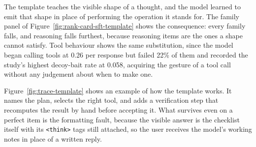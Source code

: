 The template teaches the visible shape of a thought, and the model learned to emit that shape in place of performing the operation it stands for. The family panel of Figure~\ref{fig:rank-card-sft-template} shows the consequence: every family falls, and reasoning falls furthest, because reasoning items are the ones a shape cannot satisfy. Tool behaviour shows the same substitution, since the model began calling tools at 0.26 per response but failed 22\% of them and recorded the study's highest decoy-bait rate at 0.058, acquiring the gesture of a tool call without any judgement about when to make one.

Figure~\ref{fig:trace-template} shows an example of how the template works. It names the plan, selects the right tool, and adds a verification step that recomputes the result by hand before accepting it. What survives even on a perfect item is the formatting fault, because the visible answer is the checklist itself with its \texttt{<think>} tags still attached, so the user receives the model's working notes in place of a written reply.

